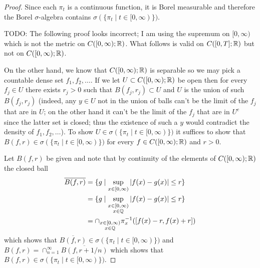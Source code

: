 \begin{proof}Since each $\pi_t$ is a continuous function, it is Borel
  measurable and therefore the Borel $\sigma$-algebra contains
  $\sigma(\lbrace \pi_t \mid t \in [0,\infty) \rbrace)$.

TODO: The following proof looks incorrect; I am using the supremum on $[0,\infty)$ which is not the metric on $C([0,\infty); \mathbb{R})$.  What follows is valid on $C([0,T];\mathbb{R})$ but not on $C([0,\infty); \mathbb{R})$.

On the other hand, we know that $C([0,\infty) ; \mathbb{R})$ is separable
so we may pick a countable dense set $f_1, f_2, \dotsc$.
If we let $U \subset C([0,\infty) ; \mathbb{R})$ be open then for every
$f_j \in U$ there exists $r_j > 0$ such that $B(f_j, r_j) \subset U$
and $U$ is the union of such $B(f_j, r_j)$ (indeed, any $y \in U$ not in the
union of balls can't be the limit of the $f_j$ that are in $U$; on the
other hand it can't be the limit of the $f_j$ that are in $U^c$ since
the latter set is closed; thus the existence of such a $y$ would
contradict the density of $f_1, f_2, \dotsc$).  To show $U \in
\sigma(\lbrace \pi_t \mid t \in [0,\infty) \rbrace)$
it suffices to show that $B(f, r) \in \sigma(\lbrace \pi_t \mid t \in
[0,\infty) \rbrace)$ for every $f \in C([0,\infty) ; \mathbb{R})$ and $r > 0$.

Let $B(f, r)$ be given and note that by continuity of the
elements of $C([0,\infty) ; \mathbb{R})$ the closed ball
\begin{align*}
\overline{B(f, r)} &= \lbrace g \mid \sup_{x \in [0,\infty)} \left \vert f(x)
  - g(x) \right \vert \leq r \rbrace \\
&= \lbrace g \mid \sup_{\substack{x \in
    [0,\infty) \\ x \in \mathbb{Q}}} \left \vert f(x)
  - g(x) \right \vert \leq r \rbrace \\
&= \cap_{\substack{x \in
    [0,\infty) \\ x \in \mathbb{Q}}} \pi_x^{-1} ([f(x)-r,f(x)+r]) 
\end{align*}
which shows that $\overline{B(f, r)} \in \sigma(\lbrace \pi_t \mid t \in
[0,\infty) \rbrace)$ and $B(f, r) = \cap_{n=1}^\infty \overline{B(f, r+1/n)}$
which shows that $B(f, r) \in \sigma(\lbrace \pi_t \mid t \in
[0,\infty) \rbrace)$.
\end{proof}

